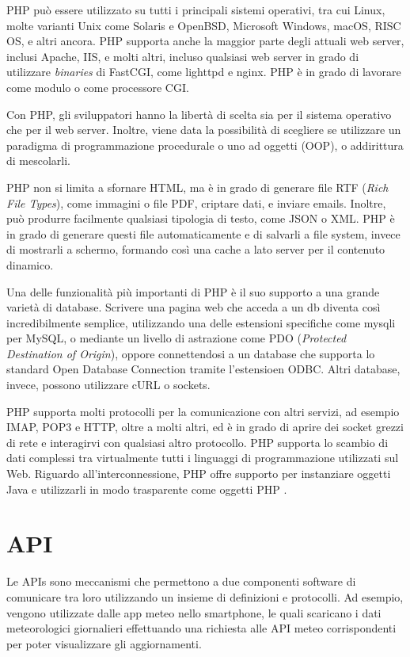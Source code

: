 PHP può essere utilizzato su tutti i principali sistemi operativi, tra cui Linux, molte varianti Unix come Solaris e OpenBSD, Microsoft Windows, macOS, RISC OS, e altri ancora. PHP supporta anche la maggior parte degli attuali web server, inclusi Apache, IIS, e molti altri, incluso qualsiasi web server in grado di utilizzare \textit{binaries} di FastCGI, come lighttpd e nginx. PHP è in grado di lavorare come modulo o come processore CGI.

Con PHP, gli sviluppatori hanno la libertà di scelta sia per il sistema operativo che per il web server. Inoltre, viene data la possibilità di scegliere se utilizzare un paradigma di programmazione procedurale o uno ad oggetti (OOP), o addirittura di mescolarli.

PHP non si limita a sfornare HTML, ma è in grado di generare file RTF (\textit{Rich File Types}), come immagini o file PDF, criptare dati, e inviare emails. Inoltre, può produrre facilmente qualsiasi tipologia di testo, come JSON o XML. PHP è in grado di generare questi file automaticamente e di salvarli a file system, invece di mostrarli a schermo, formando così una cache a lato server per il contenuto dinamico.

Una delle funzionalità più importanti di PHP è il suo supporto a una grande varietà di database. Scrivere una pagina web che acceda a un db diventa così incredibilmente semplice, utilizzando una delle estensioni specifiche come mysqli per MySQL, o mediante un livello di astrazione come PDO (\textit{Protected Destination of Origin}), oppore connettendosi a un database che supporta lo standard Open Database Connection tramite l'estensioen ODBC. Altri database, invece, possono utilizzare cURL o sockets.

PHP supporta molti protocolli per la comunicazione con altri servizi, ad esempio IMAP, POP3 e HTTP, oltre a molti altri, ed è in grado di aprire dei socket grezzi di rete e interagirvi con qualsiasi altro protocollo. PHP supporta lo scambio di dati complessi tra virtualmente tutti i linguaggi di programmazione utilizzati sul Web. Riguardo all'interconnessione, PHP offre supporto per instanziare oggetti Java e utilizzarli in modo trasparente come oggetti PHP \cite{PHP}.

\section{API}
Le APIs sono meccanismi che permettono a due componenti software di comunicare tra loro utilizzando un insieme di definizioni e protocolli. Ad esempio, vengono utilizzate dalle app meteo nello smartphone, le quali scaricano i dati meteorologici giornalieri effettuando una richiesta alle API meteo corrispondenti per poter visualizzare gli aggiornamenti.

